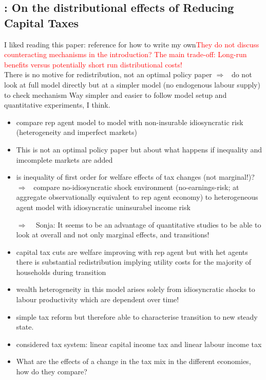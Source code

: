 \documentclass[12pt]{article}
\newcommand{\ar}{$\Rightarrow$ \ }
\newcommand{\tr}[1]{\textcolor{red}{#1}}
\begin{document}
\subsection{\cite{Domeij2004OnTaxes}: On the distributional effects of Reducing Capital Taxes} \textcolor{sonja}{I liked reading this paper: reference for how to write my own}\tr{They do not discuss counteracting mechanisms in the introduction? The main trade-off: Long-run benefits versus potentially short run distributional costs!  } \\
There is no motive for redistribution, not an optimal policy paper \ar do not look at full model directly but at a simpler model (no endogenous labour supply) to check mechanism
\textcolor{sonja}{Way simpler and easier to follow model setup and quantitative experiments, I think. }
\begin{itemize}
\item compare rep agent model to model with non-insurable idiosyncratic risk (heterogeneity and imperfect markets)
\item This is not an optimal policy paper but about what happens if inequality and imcomplete markets are added
\item is inequality of first order for welfare effects of  tax changes (not marginal!)? \ar compare no-idiosyncratic shock environment (no-earnings-risk; at aggregate observationally equivalent to rep agent economy) to heterogeneous agent model with idiosyncratic uninsurabel income risk
\item[\ar] \textcolor{sonja}{Sonja: It seems to be an advantage of quantitative studies to be able to look at overall and not only marginal effects, and transitions!}
\item capital tax cuts are welfare improving with rep agent but with het agents there is substantial redistribution implying utility costs for the majority of households during transition
\item wealth heterogeneity in this model arises solely from idiosyncratic  shocks to labour productivity which are dependent over time!
\item simple tax reform but therefore able to characterise transition to new steady state.
\item considered tax system: 
linear capital income tax and linear labour income tax
\item What are the effects of a change in the tax mix in the different economies, how do they compare? 

\end{itemize}
\end{document}
